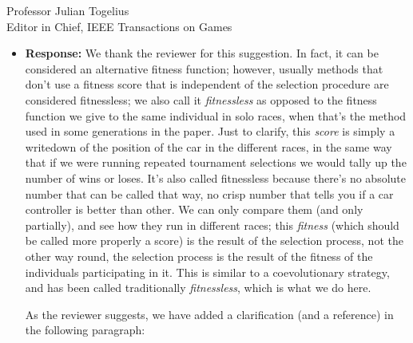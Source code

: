 \documentclass[10pt]{letter} %
\begin{document}
\begin{letter}{Professor Julian Togelius \\ Editor in Chief, IEEE Transactions on Games}
\begin{enumerate}
\begin{itemize}
		\item {\bf Response:}
		We thank the reviewer for this suggestion. In fact, it can be
considered an alternative fitness function; however, usually methods
that don't use a fitness score that is independent of the selection
procedure are considered fitnessless; we also call it {\em
  fitnessless} as opposed to the fitness function we give to the same
individual in solo races, when that's the method used in some
generations in the paper. Just to clarify, this {\em score} is simply
a writedown of the position of the car in the different races, in the
same way that if we were running repeated tournament selections we
would tally up the number of wins or loses. It's also called
fitnessless because there's no absolute number that can be called that
way, no crisp number that tells you if a car controller is better than
other. We can only compare them (and only partially), and see how they
run in different races; this {\em fitness} (which should be called
more properly a score) is the result of the selection process, not the
other way round, the selection process is the result of the fitness of
the individuals participating in it. This is similar to a
coevolutionary strategy, and has been called traditionally {\em
  fitnessless}, which is what we do here.

As the reviewer suggests, we have added a clarification (and a
reference) in the following paragraph:


\end{itemize}
\end{enumerate}
\end{letter}
\end{document}
